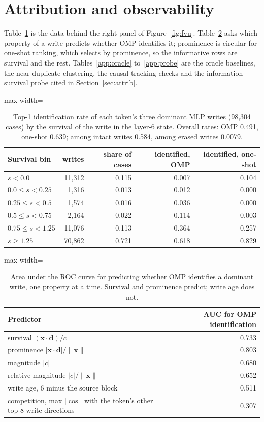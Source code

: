 \section{Attribution and observability}\label{app:attrib}
Table~\ref{app:survbins} is the data behind the right panel of Figure~\ref{fig:fvu}. Table~\ref{app:auc} asks which property of a write predicts whether OMP identifies it; prominence is circular for one-shot ranking, which selects by prominence, so the informative rows are survival and the rest. Tables~\ref{app:oracle} to~\ref{app:probe} are the oracle baselines, the near-duplicate clustering, the causal tracking checks and the information-survival probe cited in Section~\ref{sec:attrib}.
\begin{table}[H]\centering\small
\caption{Top-1 identification rate of each token's three dominant MLP writes (98,304 cases) by the survival of the write in the layer-6 state. Overall rates: OMP 0.491, one-shot 0.639; among intact writes 0.584, among erased writes 0.0079.}\label{app:survbins}
\begin{adjustbox}{max width=\linewidth}
\begin{tabular}{lrrrr}\toprule
Survival bin & writes & share of cases & identified, OMP & identified, one-shot \\ \midrule
$s<0.0$ & 11,312 & 0.115 & 0.007 & 0.104 \\
$0.0\le s<0.25$ & 1,316 & 0.013 & 0.012 & 0.000 \\
$0.25\le s<0.5$ & 1,574 & 0.016 & 0.036 & 0.000 \\
$0.5\le s<0.75$ & 2,164 & 0.022 & 0.114 & 0.003 \\
$0.75\le s<1.25$ & 11,076 & 0.113 & 0.364 & 0.257 \\
$s\ge 1.25$ & 70,862 & 0.721 & 0.618 & 0.829 \\
\bottomrule\end{tabular}\end{adjustbox}
\end{table}
\begin{table}[H]\centering\small
\caption{Area under the ROC curve for predicting whether OMP identifies a dominant write, one property at a time. Survival and prominence predict; write age does not.}\label{app:auc}
\begin{adjustbox}{max width=\linewidth}
\begin{tabular}{lr}\toprule
Predictor & AUC for OMP identification \\ \midrule
survival $(\mathbf{x}\cdot\mathbf{d})/c$ & 0.733 \\
prominence $|\mathbf{x}\cdot\mathbf{d}|/\lVert\mathbf{x}\rVert$ & 0.803 \\
magnitude $|c|$ & 0.680 \\
relative magnitude $|c|/\lVert\mathbf{x}\rVert$ & 0.652 \\
write age, $6$ minus the source block & 0.511 \\
competition, max $|\cos|$ with the token's other top-8 write directions & 0.307 \\
\bottomrule\end{tabular}\end{adjustbox}
\end{table}
